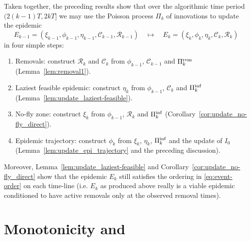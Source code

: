 \documentclass[]{article}
\newcommand{\Conditioned}{\mathcal{C}}
\newcommand{\Epidemic}{E}%
\newcommand{\Removals}{\mathcal{R}}
\newcommand{\Poisson}{\Pi}
\newcommand{\PoissonRem}{\Poisson^\textup{rem}}
\newcommand{\PoissonInf}{\Poisson^\textup{inf}}
\begin{document}
Taken together, the preceding results show that over the algorithmic time period \((2(k{-}1)T,2kT]\) we may use the Poisson process \(\Poisson_k\) of innovations to update the epidemic 
    \[
    	\Epidemic_{k-1} = (\xi_{k-1}, \phi_{k-1}, \eta_{k-1}, \Conditioned_{k-1}, \Removals_{k-1}) \quad \mapsto \quad \Epidemic_k =(\xi_k, \phi_k, \eta_k, \Conditioned_k, \Removals_k)
    \]
    in four simple steps:
\begin{enumerate}
	\item Removals: construct \(\Removals_k\) and \(\Conditioned_k\) from \(\phi_{k-1}\), \(\Conditioned_{k-1}\) and \(\PoissonRem_k\) (Lemma~\ref{lem:removal1}).
	\item Laziest feasible epidemic: construct \(\eta_k\) from \(\phi_{k-1}\), \(\Conditioned_k\) and \(\PoissonInf_k\) (Lemma~\ref{lem:update_laziest-feasible}).
	\item No-fly zone: construct \(\xi_k\) from \(\phi_{k-1}\), \(\Removals_k\) and \(\PoissonInf_k\) (Corollary~\ref{cor:update_no-fly_direct}).
	\item Epidemic trajectory: construct \(\phi_k\) from \(\xi_k\), \(\eta_k\), \(\PoissonInf_k\) and the update of \(I_0\) (Lemma~\ref{lem:update_epi_trajectory} and the preceding discussion).
\end{enumerate}
Moreover, Lemma~\ref{lem:update_laziest-feasible} and Corollary~\ref{cor:update_no-fly_direct} show that the epidemic \(\Epidemic_k\) still satisfies the ordering in \eqref{eq:event-order} on each time-line (i.e. \(\Epidemic_k\) as produced above really is a viable epidemic conditioned to have active removals only at the observed removal times).


 
 \section{Monotonicity and \CFTP}\label{sec:cftp}

\end{document}
